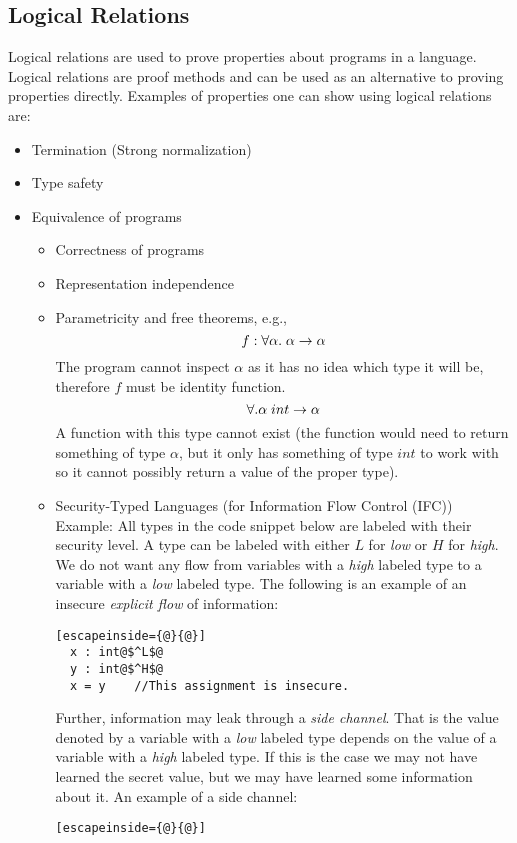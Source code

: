 \subsection*{Logical Relations}
Logical relations are used to prove properties about programs in a language. Logical relations are proof methods and can be used as an alternative to proving properties directly. Examples of properties one can show using logical relations are:
\begin{itemize}
\item Termination (Strong normalization)
\item Type safety
\item Equivalence of programs
  \begin{itemize}
  \item Correctness of programs
  \item Representation independence
  \item Parametricity and free theorems, e.g.,
    \[
    f: \forall \alpha. \;  \alpha \rightarrow \alpha
    \]
    The program cannot inspect $\alpha$ as it has no idea which type it will be, therefore $f$ must be identity function.
    \[
    \forall. \alpha \;  int \rightarrow \alpha
    \]
    A function with this type cannot exist (the function would need to return something of type $\alpha$, but it only has something of type $int$ to work with so it cannot possibly return a value of the proper type).
  \item Security-Typed Languages (for Information Flow Control (IFC))\\
        Example: All types in the code snippet below are labeled with their security level. A type can be labeled with either $L$ for \emph{low} or $H$ for \emph{high}. We do not want any flow from variables with a \emph{high} labeled type to a variable with a \emph{low} labeled type. The following is an example of an insecure \emph{explicit flow} of information:
        \begin{lstlisting}[escapeinside={@}{@}]
  x : int@$^L$@
  y : int@$^H$@
  x = y    //This assignment is insecure.
        \end{lstlisting}
Further, information may leak through a \emph{side channel}. That is the value denoted by a variable with a \emph{low} labeled type depends on the value of a variable with a \emph{high} labeled type. If this is the case we may not have learned the secret value, but we may have learned some information about it. An example of a side channel:
        \begin{lstlisting}[escapeinside={@}{@}]

\end{lstlisting}
\end{itemize}
\end{itemize}
